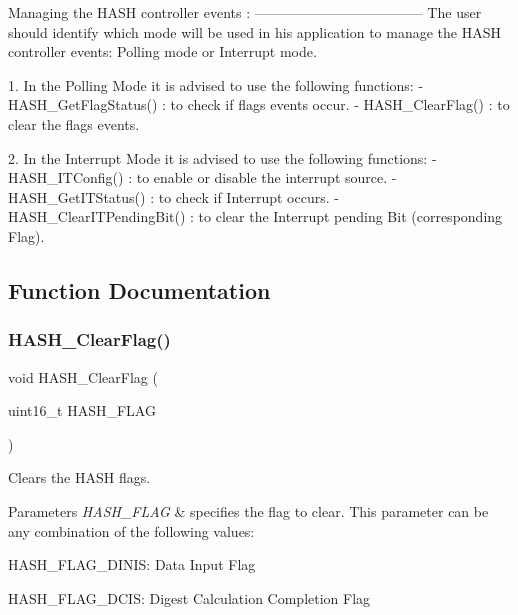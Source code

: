 \begin{DoxyVerb}
  Managing the HASH controller events :
  ------------------------------------ 
  The user should identify which mode will be used in his application to manage 
  the HASH controller events: Polling mode or Interrupt mode.
  
  1.  In the Polling Mode it is advised to use the following functions:
      - HASH_GetFlagStatus() : to check if flags events occur. 
      - HASH_ClearFlag()     : to clear the flags events.
    
  2.  In the Interrupt Mode it is advised to use the following functions:
      - HASH_ITConfig()       : to enable or disable the interrupt source.
      - HASH_GetITStatus()    : to check if Interrupt occurs.
      - HASH_ClearITPendingBit() : to clear the Interrupt pending Bit 
                                (corresponding Flag). \end{DoxyVerb}
 

\subsection{Function Documentation}
\mbox{\label{group__HASH__Group5_ga0ec1269a1f30a1e7be0e3045d72ebcf6}} 
\subsubsection{H\+A\+S\+H\+\_\+\+Clear\+Flag()}
{\footnotesize\ttfamily void H\+A\+S\+H\+\_\+\+Clear\+Flag (\begin{DoxyParamCaption}\item[{uint16\+\_\+t}]{H\+A\+S\+H\+\_\+\+F\+L\+AG }\end{DoxyParamCaption})}



Clears the H\+A\+SH flags. 


\begin{DoxyParams}{Parameters}
{\em H\+A\+S\+H\+\_\+\+F\+L\+AG} & specifies the flag to clear. This parameter can be any combination of the following values\+: \begin{DoxyItemize}
\item H\+A\+S\+H\+\_\+\+F\+L\+A\+G\+\_\+\+D\+I\+N\+IS\+: Data Input Flag \item H\+A\+S\+H\+\_\+\+F\+L\+A\+G\+\_\+\+D\+C\+IS\+: Digest Calculation Completion Flag \end{DoxyItemize}
\\
\hline
\end{DoxyParams}

